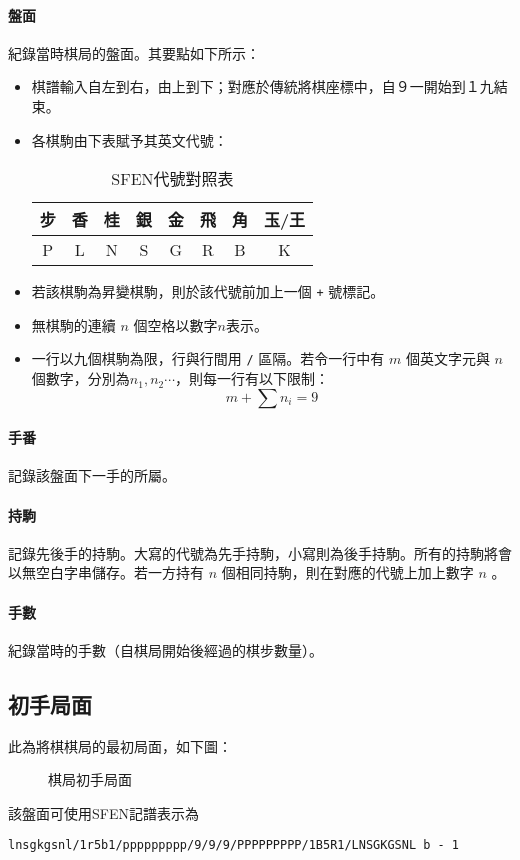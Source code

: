 	\paragraph{盤面}
	紀錄當時棋局的盤面。其要點如下所示：
	\begin{itemize}
	    \item 棋譜輸入自左到右，由上到下；對應於傳統將棋座標中，自９一開始到１九結束。
	    \item 各棋駒由下表賦予其英文代號：
	    \begin{table}[h]
	        \centering
	        \begin{tabular}{c|c|c|c|c|c|c|c}
	           步  &香 & 桂 &銀&金&飛&角&玉/王 \\
	           \hline
	             P  &L & N &S&G&R&B&K
	        \end{tabular}
	        \caption{SFEN代號對照表}
	        \label{tab:my_label}
	    \end{table}
	    \item 若該棋駒為昇變棋駒，則於該代號前加上一個 \verb|+| 號標記。
	    \item 無棋駒的連續 $n$ 個空格以數字$n$表示。
	    \item 一行以九個棋駒為限，行與行間用 \verb|/| 區隔。若令一行中有 $m$ 個英文字元與 $n$ 個數字，分別為$n_1, n_2 \cdots$，則每一行有以下限制：
	    $$
	    m + \sum n_i = 9
	    $$
	\end{itemize}
	\paragraph{手番}記錄該盤面下一手的所屬。
	\paragraph{持駒}記錄先後手的持駒。大寫的代號為先手持駒，小寫則為後手持駒。所有的持駒將會以無空白字串儲存。若一方持有 $n$ 個相同持駒，則在對應的代號上加上數字 $n$ 。
	\paragraph{手數}紀錄當時的手數（自棋局開始後經過的棋步數量）。
	
    \subsection{初手局面}
    此為將棋棋局的最初局面，如下圖：
    \begin{figure}[h]
        \centering
          \shogiban{\hirate}
        \caption{棋局初手局面}
        \label{fig:my_label}
    \end{figure}
    該盤面可使用SFEN記譜表示為
    \begin{lstlisting}
lnsgkgsnl/1r5b1/ppppppppp/9/9/9/PPPPPPPPP/1B5R1/LNSGKGSNL b - 1
\end{lstlisting}